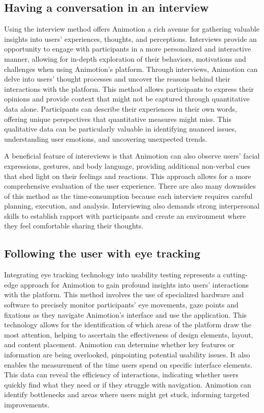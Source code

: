 \subsection{Having a conversation in an interview}
Using the interview method offers Animotion a rich avenue for gathering valuable insights into users' 
experiences, thoughts, and perceptions. Interviews provide an opportunity to engage with participants in a more 
personalized and interactive manner, allowing for in-depth exploration of their behaviors, motivations and challenges when using Animotion's platform.
Through interviews, Animotion can delve into users' thought processes and uncover the reasons behind their interactions with the platform. 
This method allows participants to express their opinions and provide context that might not be captured through quantitative data alone.
Participants can describe their experiences in their own words, offering unique perspectives that quantitative measures might miss. 
This qualitative data can be particularly valuable in identifying nuanced issues, understanding user emotions, and uncovering 
unexpected trends. \cite{syp}

A beneficial feature of intereviews is that Animotion can also observe users' facial expressions, gestures, and body 
language, providing additional non-verbal cues that shed light on their feelings and reactions. This approach allows 
for a more comprehensive evaluation of the user experience. There are also many downsides of this method as the time-consumption
because  each interview requires careful planning, execution, and analysis. Interviewing also demands strong interpersonal skills to 
establish rapport with participants and create an environment where they feel comfortable sharing their thoughts. \cite{interview}

\subsection{Following the user with eye tracking}
Integrating eye tracking technology into usability testing represents a cutting-edge approach for Animotion to gain profound insights into users'
interactions with the platform. This method involves the use of specialized hardware and software to precisely monitor participants' eye movements,
gaze points and fixations as they navigate Animotion's interface and use the application. This technology allows for the identification of which areas 
of the platform draw the most attention, helping to ascertain the effectiveness of design elements, layout, and content placement. 
Animotion can determine whether key features or information are being overlooked, pinpointing potential usability issues.
It also enables the measurement of the time users spend on specific interface elements. This data can reveal the efficiency of interactions,
indicating whether users quickly find what they need or if they struggle with navigation. Animotion can identify bottlenecks and 
areas where users might get stuck, informing targeted improvements. \cite{eye1}

